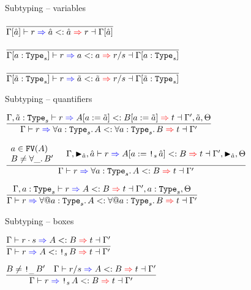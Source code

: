 \documentclass{beamer}
\begin{document}
\begin{frame}{Subtyping -- variables}

\begin{center}
  $\infrule{}{\subtyping{\holectx{\Gamma}{\evar{a}}}{r}{\evar{a}}{\evar{a}}{r}{\holectx{\Gamma}{\evar{a}}}}$

  \vspace{2em}

  $\infrule{}{\subtyping{\holectx{\Gamma}{\var{a}{\Type[s]}}}{r}{a}{a}{\divqty{r}{s}}{\holectx{\Gamma}{\var{a}{\Type[s]}}}}$

  \vspace{2em}

  $\infrule{}{\subtyping{\holectx{\Gamma}{\stvar{a}[s]}}{r}{\stvar{a}}{\stvar{a}}{\divqty{r}{s}}{\holectx{\Gamma}{\stvar{a}[s]}}}$
\end{center}

\end{frame}

\begin{frame}{Subtyping -- quantifiers}

\begin{center}
  $\infrule{\subtyping{\Gamma, \stvar{a}[s]}{r}{\subst{A}{a}{\stvar{a}}}{\subst{B}{a}{\stvar{a}}}{t}{\Gamma', \stvar{a}, \Theta}}{\subtyping{\Gamma}{r}{\ForallI{a}[s]{A}}{\ForallI{a}[s]{B}}{t}{\Gamma'}}$

  \vspace{2em}

  $\infrule{\begin{array}{l} a \in \FV{A} \\ B \neq \ForallI{\_}{B'} \end{array} \quad \subtyping{\Gamma, \marker{\evar{a}}, \evar{a}}{r}{\subst{A}{a}{\Box[s]{\evar{a}}}}{B}{t}{\Gamma', \marker{\evar{a}}, \Theta}}{\subtyping{\Gamma}{r}{\ForallI{a}[s]{A}}{B}{t}{\Gamma'}}$

  \vspace{2em}

  $\infrule{\subtyping{\Gamma, \var{a}{\Type[s]}}{r}{A}{B}{t}{\Gamma', \var{a}{\Type[s]}, \Theta}}{\subtyping{\Gamma}{r}{\ForallE{a}[s]{A}}{\ForallE{a}[s]{B}}{t}{\Gamma'}}$
\end{center}

\end{frame}

\begin{frame}{Subtyping -- boxes}

\begin{center}

  $\infrule{\subtyping{\Gamma}{\mulqty{r}{s}}{A}{B}{t}{\Gamma'}}{\subtyping{\Gamma}{r}{A}{\Box[s]{B}}{t}{\Gamma'}}$

  \vspace{2em}

  $\infrule{B \neq \Box[\_]{B'} \quad \subtyping{\Gamma}{\divqty{r}{s}}{A}{B}{t}{\Gamma'}}{\subtyping{\Gamma}{r}{\Box[s]{A}}{B}{t}{\Gamma'}}$
\end{center}

\end{frame}
\end{document}
